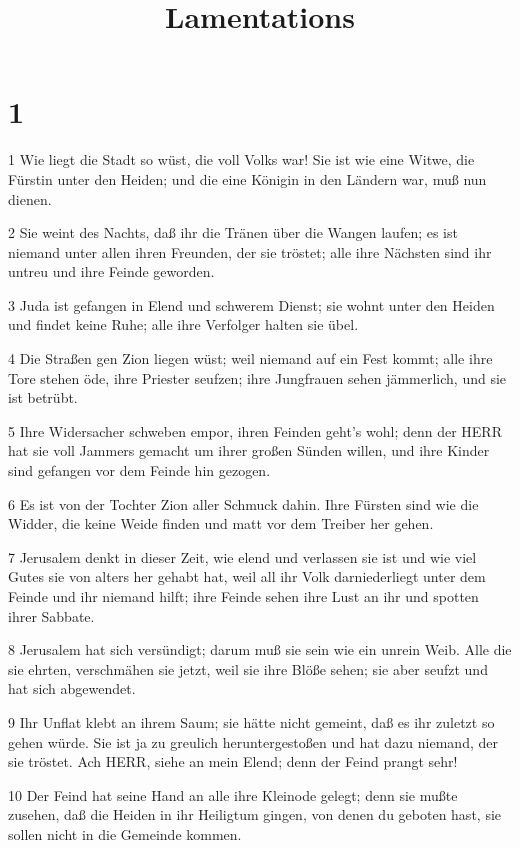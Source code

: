 

\title{Lamentations}


\chapter{1}

\par 1 Wie liegt die Stadt so wüst, die voll Volks war! Sie ist wie eine Witwe, die Fürstin unter den Heiden; und die eine Königin in den Ländern war, muß nun dienen.
\par 2 Sie weint des Nachts, daß ihr die Tränen über die Wangen laufen; es ist niemand unter allen ihren Freunden, der sie tröstet; alle ihre Nächsten sind ihr untreu und ihre Feinde geworden.
\par 3 Juda ist gefangen in Elend und schwerem Dienst; sie wohnt unter den Heiden und findet keine Ruhe; alle ihre Verfolger halten sie übel.
\par 4 Die Straßen gen Zion liegen wüst; weil niemand auf ein Fest kommt; alle ihre Tore stehen öde, ihre Priester seufzen; ihre Jungfrauen sehen jämmerlich, und sie ist betrübt.
\par 5 Ihre Widersacher schweben empor, ihren Feinden geht's wohl; denn der HERR hat sie voll Jammers gemacht um ihrer großen Sünden willen, und ihre Kinder sind gefangen vor dem Feinde hin gezogen.
\par 6 Es ist von der Tochter Zion aller Schmuck dahin. Ihre Fürsten sind wie die Widder, die keine Weide finden und matt vor dem Treiber her gehen.
\par 7 Jerusalem denkt in dieser Zeit, wie elend und verlassen sie ist und wie viel Gutes sie von alters her gehabt hat, weil all ihr Volk darniederliegt unter dem Feinde und ihr niemand hilft; ihre Feinde sehen ihre Lust an ihr und spotten ihrer Sabbate.
\par 8 Jerusalem hat sich versündigt; darum muß sie sein wie ein unrein Weib. Alle die sie ehrten, verschmähen sie jetzt, weil sie ihre Blöße sehen; sie aber seufzt und hat sich abgewendet.
\par 9 Ihr Unflat klebt an ihrem Saum; sie hätte nicht gemeint, daß es ihr zuletzt so gehen würde. Sie ist ja zu greulich heruntergestoßen und hat dazu niemand, der sie tröstet. Ach HERR, siehe an mein Elend; denn der Feind prangt sehr!
\par 10 Der Feind hat seine Hand an alle ihre Kleinode gelegt; denn sie mußte zusehen, daß die Heiden in ihr Heiligtum gingen, von denen du geboten hast, sie sollen nicht in die Gemeinde kommen.
